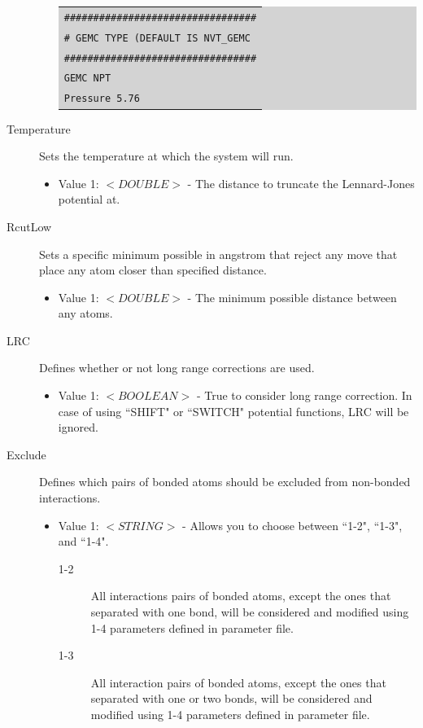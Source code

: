 \begin{description}
\begin{itemize}
	\colorbox{lightgray}{
	\begin{tabular}{l}
	\texttt{\#\#\#\#\#\#\#\#\#\#\#\#\#\#\#\#\#\#\#\#\#\#\#\#\#\#\#\#\#\#\#\#\#}\\
	\texttt{\# GEMC TYPE (DEFAULT IS NVT\_GEMC}\\
	\texttt{\#\#\#\#\#\#\#\#\#\#\#\#\#\#\#\#\#\#\#\#\#\#\#\#\#\#\#\#\#\#\#\#\#}\\
	\texttt{GEMC    NPT}\\
	\texttt{Pressure 5.76}\\
	\end{tabular}}
	\end{itemize}
\item [Temperature] Sets the temperature at which the system will run.
	\begin{itemize}
	\item Value 1: $<DOUBLE>$ - The distance to truncate the Lennard-Jones potential at.
	\end{itemize}
\item [RcutLow] Sets a specific minimum possible in angstrom that reject any move that place any atom closer than specified distance.
	\begin{itemize}
	\item Value 1: $<DOUBLE>$ - The minimum possible distance between any atoms.
	\end{itemize}
\item [LRC] Defines whether or not long range corrections are used.
	\begin{itemize}
	\item Value 1: $<BOOLEAN>$ - True to consider long range correction. In case of using ``SHIFT" or ``SWITCH" potential functions, LRC will be ignored.
	\end{itemize}
\item [Exclude] Defines which pairs of bonded atoms should be excluded from non-bonded interactions.
	\begin{itemize}
	\item Value 1: $<STRING>$ - Allows you to choose between ``1-2", ``1-3", and ``1-4".
		\begin{description}
		\item [1-2] All interactions pairs of bonded atoms, except the ones that separated with one bond, will be considered and modified using 1-4 parameters defined in parameter file.
		\item [1-3] All interaction pairs of bonded atoms, except the ones that separated with one or two bonds, will be considered and modified using 1-4 parameters defined in parameter file.

\end{description}
\end{itemize}
\end{description}
